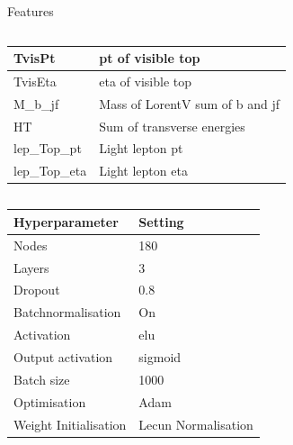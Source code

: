 \begin{frame}{Features}
\begin{columns}
\begin{column}{0.5\textwidth}
{\begin{tabular}{|l|l|}
                 TvisPt           & pt of visible top                     \\ \hline
                 TvisEta          & eta of visible top                    \\ \hline
                 M\_b\_jf         & Mass of LorentV sum of b and jf       \\ \hline
                 HT               & Sum of transverse energies            \\ \hline
                 lep\_Top\_pt     & Light lepton pt                       \\ \hline
                 lep\_Top\_eta    & Light lepton eta                      \\ \hline
             \end{tabular}}
        \end{column}
    \end{columns}
\end{frame}

\begin{frame}
    \begin{table}[]
    \begin{tabular}{|l|l|}
    \hline
    Hyperparameter          &     Setting              \\ \hline
    Nodes                   &     180                  \\ \hline
    Layers                  &     3                    \\ \hline
    Dropout                 &     0.8                  \\ \hline
    Batchnormalisation      &     On                   \\ \hline
    Activation              &     elu                  \\ \hline
    Output activation       &     sigmoid              \\ \hline
    Batch size              &     1000                 \\ \hline
    Optimisation            &     Adam                 \\ \hline
    Weight Initialisation   &     Lecun Normalisation  \\ \hline
    \end{tabular}
    \end{table}
\end{frame}
  
